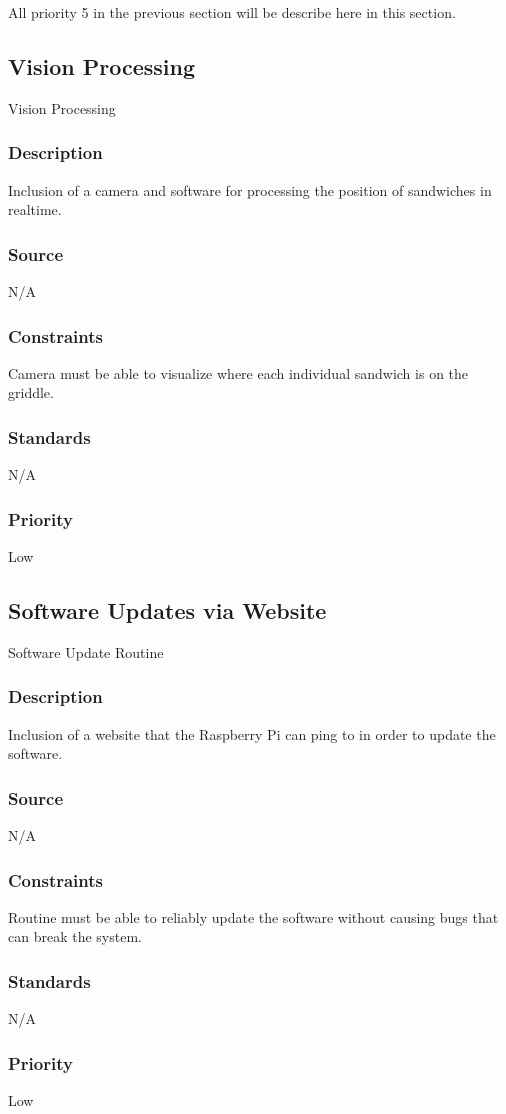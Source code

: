 All priority 5 in the previous section will be describe here in this section.

\subsection{Vision Processing}
Vision Processing
\subsubsection{Description}
Inclusion of a camera and software for processing the position of sandwiches in realtime.
\subsubsection{Source}
N/A
\subsubsection{Constraints}
Camera must be able to visualize where each individual sandwich is on the griddle.
\subsubsection{Standards}
N/A
\subsubsection{Priority}
Low

\subsection{Software Updates via Website}
Software Update Routine
\subsubsection{Description}
Inclusion of a website that the Raspberry Pi can ping to in order to update the software.
\subsubsection{Source}
N/A
\subsubsection{Constraints}
Routine must be able to reliably update the software without causing bugs that can break the system.
\subsubsection{Standards}
N/A
\subsubsection{Priority}
Low